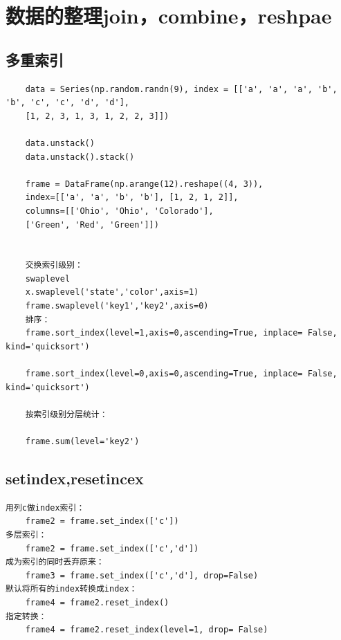 \documentclass{article}
\begin{document}
\section{数据的整理join，combine，reshpae}
\subsection{多重索引}
\begin{lstlisting}
	data = Series(np.random.randn(9), index = [['a', 'a', 'a', 'b', 'b', 'c', 'c', 'd', 'd'],
	[1, 2, 3, 1, 3, 1, 2, 2, 3]])
	
	data.unstack()
	data.unstack().stack()
	
	frame = DataFrame(np.arange(12).reshape((4, 3)),
	index=[['a', 'a', 'b', 'b'], [1, 2, 1, 2]],
	columns=[['Ohio', 'Ohio', 'Colorado'],
	['Green', 'Red', 'Green']])
	
	
	交换索引级别：
	swaplevel
	x.swaplevel('state','color',axis=1)
	frame.swaplevel('key1','key2',axis=0)
	排序：
	frame.sort_index(level=1,axis=0,ascending=True, inplace= False, kind='quicksort')
	
	frame.sort_index(level=0,axis=0,ascending=True, inplace= False, kind='quicksort')
	
	按索引级别分层统计：
	
	frame.sum(level='key2')
\end{lstlisting}

\subsection{setindex,resetincex}
\begin{lstlisting}
用列c做index索引：
	frame2 = frame.set_index(['c'])
多层索引：
    frame2 = frame.set_index(['c','d'])	
成为索引的同时丢弃原来：
	frame3 = frame.set_index(['c','d'], drop=False)	
默认将所有的index转换成index：
	frame4 = frame2.reset_index()
指定转换：	
	frame4 = frame2.reset_index(level=1, drop= False) 
\end{lstlisting}
\end{document}

